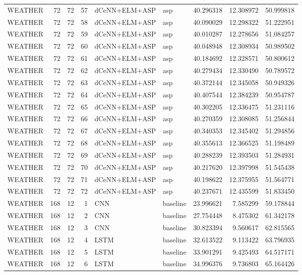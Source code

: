 \begin{table}
\begin{tabular}{lrrrllrrr}
WEATHER & 72 & 72 & 57 & dCeNN+ELM+ASP & asp & 40.296318 & 12.308972 & 50.999818 \\
WEATHER & 72 & 72 & 58 & dCeNN+ELM+ASP & asp & 40.090029 & 12.298322 & 51.222951 \\
WEATHER & 72 & 72 & 59 & dCeNN+ELM+ASP & asp & 40.010287 & 12.278656 & 51.084257 \\
WEATHER & 72 & 72 & 60 & dCeNN+ELM+ASP & asp & 40.048948 & 12.308934 & 50.989502 \\
WEATHER & 72 & 72 & 61 & dCeNN+ELM+ASP & asp & 40.184692 & 12.328571 & 50.800612 \\
WEATHER & 72 & 72 & 62 & dCeNN+ELM+ASP & asp & 40.279434 & 12.330490 & 50.789572 \\
WEATHER & 72 & 72 & 63 & dCeNN+ELM+ASP & asp & 40.372144 & 12.345058 & 50.949326 \\
WEATHER & 72 & 72 & 64 & dCeNN+ELM+ASP & asp & 40.407544 & 12.384239 & 50.954787 \\
WEATHER & 72 & 72 & 65 & dCeNN+ELM+ASP & asp & 40.302205 & 12.336475 & 51.231116 \\
WEATHER & 72 & 72 & 66 & dCeNN+ELM+ASP & asp & 40.270359 & 12.308085 & 51.256844 \\
WEATHER & 72 & 72 & 67 & dCeNN+ELM+ASP & asp & 40.340353 & 12.345402 & 51.294856 \\
WEATHER & 72 & 72 & 68 & dCeNN+ELM+ASP & asp & 40.355613 & 12.366525 & 51.198489 \\
WEATHER & 72 & 72 & 69 & dCeNN+ELM+ASP & asp & 40.288239 & 12.393503 & 51.284931 \\
WEATHER & 72 & 72 & 70 & dCeNN+ELM+ASP & asp & 40.217620 & 12.397998 & 51.545438 \\
WEATHER & 72 & 72 & 71 & dCeNN+ELM+ASP & asp & 40.198622 & 12.375955 & 51.564771 \\
WEATHER & 72 & 72 & 72 & dCeNN+ELM+ASP & asp & 40.237671 & 12.435599 & 51.833450 \\
WEATHER & 168 & 12 & 1 & CNN & baseline & 23.996621 & 7.585299 & 59.178844 \\
WEATHER & 168 & 12 & 2 & CNN & baseline & 27.754448 & 8.475302 & 61.342178 \\
WEATHER & 168 & 12 & 3 & CNN & baseline & 30.823394 & 9.560617 & 62.815565 \\
WEATHER & 168 & 12 & 4 & LSTM & baseline & 32.613522 & 9.113422 & 63.796935 \\
WEATHER & 168 & 12 & 5 & LSTM & baseline & 33.901291 & 9.425493 & 64.517171 \\
WEATHER & 168 & 12 & 6 & LSTM & baseline & 34.996376 & 9.736803 & 65.164426 \\

\end{tabular}
\end{table}
